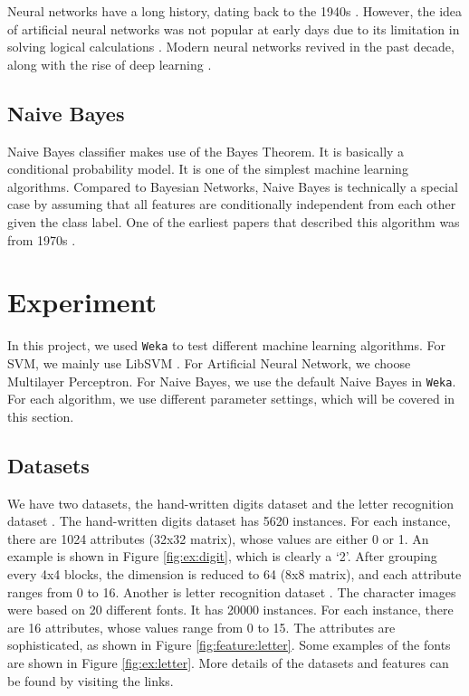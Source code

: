 \documentclass[11pt]{article}
\begin{document}
Neural networks have a long history, dating back to the 1940s \cite{mcculloch1943logical}. However, the idea of artificial neural networks was not popular at early days due to its limitation in solving logical calculations \cite{minsky1988perceptrons}. Modern neural networks revived in the past decade, along with the rise of deep learning \cite{bengio2009learning, schmidhuber2015deep}.

\subsection{Naive Bayes}
Naive Bayes classifier makes use of the Bayes Theorem. It is basically a conditional probability model. It is one of the simplest machine learning algorithms. Compared to Bayesian Networks, Naive Bayes is technically a special case by assuming that all features are conditionally independent from each other given the class label. One of the earliest papers that described this algorithm was from 1970s \cite{duda1973pattern}. 

\section{Experiment}\label{exp}
In this project, we used \texttt{Weka} \cite{hall2009weka} to test different machine learning algorithms. For SVM, we mainly use LibSVM \cite{Chang2001}. For Artificial Neural Network, we choose Multilayer Perceptron. For Naive Bayes, we use the default Naive Bayes in \texttt{Weka}. For each algorithm, we use different parameter settings, which will be covered in this section.

\subsection{Datasets}
We have two datasets, the hand-written digits dataset \cite{digitdataset} and the letter recognition dataset \cite{letterdataset}. The hand-written digits dataset has 5620 instances. For each instance, there are 1024 attributes (32x32 matrix), whose values are either 0 or 1. An example is shown in Figure \ref{fig:ex:digit}, which is clearly a `2'. After grouping every 4x4 blocks, the dimension is reduced to 64 (8x8 matrix), and each attribute ranges from 0 to 16. Another is letter recognition dataset \cite{letterdataset}. The character images were based on 20 different fonts. It has 20000 instances. For each instance, there are 16 attributes, whose values range from 0 to 15. The attributes are sophisticated, as shown in Figure \ref{fig:feature:letter}. Some examples of the fonts are shown in Figure \ref{fig:ex:letter}. More details of the datasets and features can be found by visiting the links.
\end{document}
